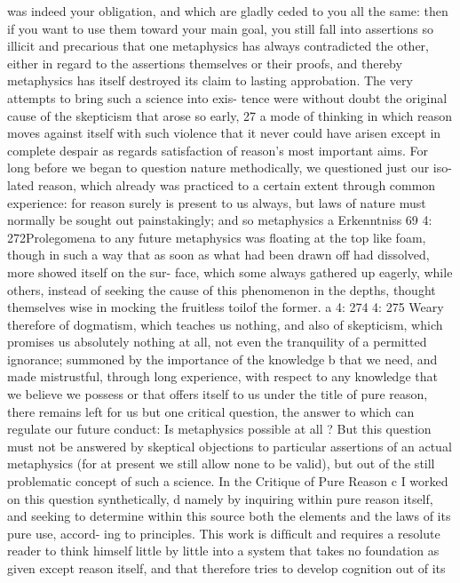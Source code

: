 was indeed your obligation, and which are gladly ceded to you all the
same: then if you want to use them toward your main goal, you still fall
into assertions so illicit and precarious that one metaphysics has always
contradicted the other, either in regard to the assertions themselves or
their proofs, and thereby metaphysics has itself destroyed its claim to
lasting approbation. The very attempts to bring such a science into exis-
tence were without doubt the original cause of the skepticism that arose
so early, 27 a mode of thinking in which reason moves against itself with
such violence that it never could have arisen except in complete despair
as regards satisfaction of reason’s most important aims. For long before
we began to question nature methodically, we questioned just our iso-
lated reason, which already was practiced to a certain extent through
common experience: for reason surely is present to us always, but laws
of nature must normally be sought out painstakingly; and so metaphysics
a
Erkenntniss
69
4: 272Prolegomena to any future metaphysics
was ﬂoating at the top like foam, though in such a way that as soon as
what had been drawn off had dissolved, more showed itself on the sur-
face, which some always gathered up eagerly, while others, instead of
seeking the cause of this phenomenon in the depths, thought themselves
wise in mocking the fruitless toilof the former. a
4: 274
4: 275
Weary therefore of dogmatism, which teaches us nothing, and also
of skepticism, which promises us absolutely nothing at all, not even
the tranquility of a permitted ignorance; summoned by the importance
of the knowledge b that we need, and made mistrustful, through long
experience, with respect to any knowledge that we believe we possess or
that offers itself to us under the title of pure reason, there remains left
for us but one critical question, the answer to which can regulate our
future conduct: Is metaphysics possible at all ? But this question must not
be answered by skeptical objections to particular assertions of an actual
metaphysics (for at present we still allow none to be valid), but out of
the still problematic concept of such a science.
In the Critique of Pure Reason c I worked on this question synthetically, d
namely by inquiring within pure reason itself, and seeking to determine
within this source both the elements and the laws of its pure use, accord-
ing to principles. This work is difﬁcult and requires a resolute reader to
think himself little by little into a system that takes no foundation as given
except reason itself, and that therefore tries to develop cognition out of its
